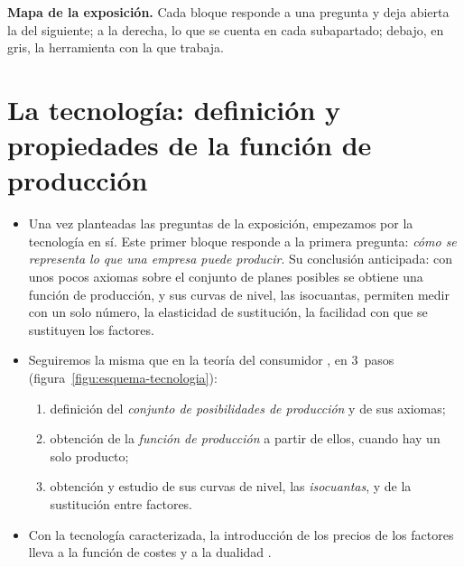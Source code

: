 \documentclass[11pt]{article}
\begin{document}
\begin{anotaciones}
\textbf{Mapa de la exposición.} Cada bloque responde a una pregunta y deja abierta la del siguiente; a la derecha, lo que se cuenta en cada subapartado; debajo, en gris, la herramienta con la que trabaja.
\begin{infografiacaja}
\caption{Mapa del tema: la pregunta de cada bloque, sus subapartados y el hilo que los une}\label{figu:mapa-tema}
\end{infografiacaja}
\end{anotaciones}



\section{La tecnología:\cortetitulo{} definición y propiedades de la función de producción}\label{sec:tecnologia-definicion-propiedades}

\begin{itemize}
\item Una vez planteadas las preguntas de la exposición, empezamos por la tecnología en sí. Este primer bloque responde a la primera pregunta: \emph{cómo se representa lo que una empresa puede producir}. Su conclusión anticipada: con unos pocos axiomas sobre el conjunto de planes posibles se obtiene una función de producción, y sus curvas de nivel, las isocuantas, permiten medir con un solo número, la elasticidad de sustitución, la facilidad con que se sustituyen los factores.
\item Seguiremos la misma  que en la teoría del consumidor , en 3~pasos (figura~\ref{figu:esquema-tecnologia}):
  \begin{enumerate}
  \item definición del \emph{conjunto de posibilidades de producción} y de sus axiomas;
  \item obtención de la \emph{función de producción} a partir de ellos, cuando hay un solo producto;
  \item obtención y estudio de sus curvas de nivel, las \emph{isocuantas}, y de la sustitución entre factores.
  \end{enumerate}
\item Con la tecnología caracterizada, la introducción de los precios de los factores lleva a la función de costes y a la dualidad .
\end{itemize}
\end{document}
